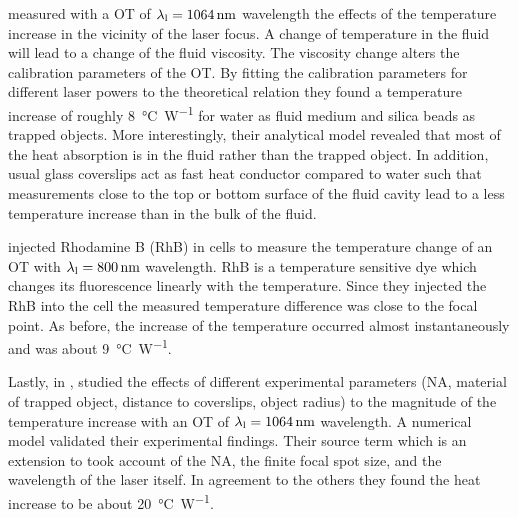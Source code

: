  measured with a OT of $\lal=\SI{1064}{\nm}$ wavelength the 
effects of the temperature increase in the vicinity of the laser focus. A 
change of temperature in the fluid will lead to a change of the fluid 
viscosity. The viscosity change alters the calibration parameters of the OT. By 
fitting the calibration parameters for different laser powers to the 
theoretical relation they found a temperature increase of roughly 
\SI{8}{\degreeCelsius\per\watt} for water as fluid medium and silica beads as 
trapped objects. More interestingly, their analytical model revealed that most 
of the heat absorption is in the fluid rather than the trapped object. In 
addition, usual glass coverslips act as fast heat conductor compared to water 
such that measurements close to the top or bottom surface of the fluid cavity 
lead to a less temperature increase than in the bulk of the fluid.

 injected Rhodamine B (RhB) in cells to measure the 
temperature change of an OT with $\lal=\SI{800}{\nm}$ wavelength. RhB is a 
temperature sensitive dye which changes its fluorescence linearly with the 
temperature. Since they injected the RhB into the cell the measured 
temperature difference was close to the focal point. As before, the increase of 
the temperature occurred almost instantaneously and was about 
\SI{9}{\degreeCelsius\per\watt}.

Lastly, in \citeyear{Catala2017},  studied the effects of 
different experimental parameters (NA, material of trapped object, distance to 
coverslips, object radius) to the magnitude of the temperature increase with an 
OT of $\lal=\SI{1064}{\nm}$ wavelength. A numerical model validated their 
experimental findings. Their source term which is an extension to 
 took account of the NA, the finite focal spot size, and 
the wavelength of the laser itself. In agreement to the others they found the 
heat increase to be about \SI{20}{\degreeCelsius\per\watt}.

